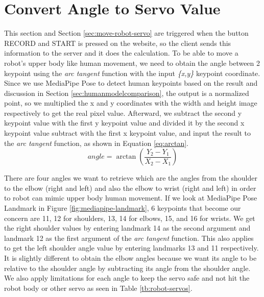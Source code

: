 \section{Convert Angle to Servo Value}
\label{sec:convert-angle-to-servo-value}

This section and Section \ref{sec:move-robot-servo} are triggered when the button RECORD and START is pressed on the website, so the client sends this information to the server and it does the calculation. 
To be able to move a robot's upper body like human movement, we need to obtain the angle between 2 keypoint using the \emph{arc tangent} function with the input \emph{\{x,y\}} keypoint coordinate.
Since we use MediaPipe Pose to detect human keypoints based on the result and discussion in Section \ref{sec:humanmodelcomparison}, the output is a normalized point, so we multiplied the x and y coordinates with the width and height image respectively to get the real pixel value.
Afterward, we subtract the second y keypoint value with the first y keypoint value and divided it by the second x keypoint value subtract with the first x keypoint value, and input the result to the \emph{arc tangent} function, as shown in Equation \ref{eq:arctan}.
\begin{equation}
  \label{eq:arctan}
  angle = \arctan \left(\frac{Y_2 - Y_1}{X_2 - X_1}\right)
\end{equation}

There are four angles we want to retrieve which are the angles from the shoulder to the elbow (right and left) and also the elbow to wrist (right and left) in order to robot can mimic upper body human movement.
If we look at MediaPipe Pose Landmark in Figure \ref{fig:mediapipe-landmark}, 6 keypoints that become our concern are 11, 12 for shoulders, 13, 14 for elbows, 15, and 16 for wrists. 
We get the right shoulder values by entering landmark 14 as the second argument and landmark 12 as the first argument of the \emph{arc tangent} function. This also applies to get the left shoulder angle value by entering landmarks 13 and 11 respectively. 
It is slightly different to obtain the elbow angles because we want its angle to be relative to the shoulder angle by subtracting its angle from the shoulder angle. We also apply limitations for each angle to keep the servo safe and not hit the robot body or other servo as seen in Table \ref{tb:robot-servos}.

